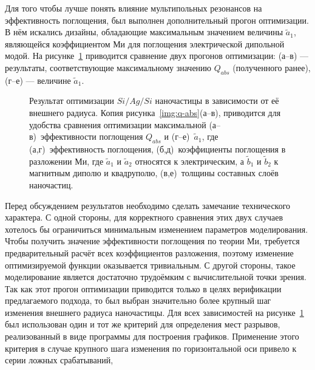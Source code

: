 Для того чтобы лучше понять влияние мультипольных резонансов на
эффективность поглощения, был выполнен дополнительный прогон
оптимизации. В нём искались дизайны, обладающие максимальным значением
величины $\tilde{a}_1$, являющейся коэффициентом Ми для поглощения
электрической дипольной модой. На рисунке~\ref{img:q-abs-a1}
приводится сравнение двух прогонов оптимизации: (а--в) --- результаты,
соответствующие максимальному значению $Q_{abs}$ (полученного ранее),
(г--е) --- величине $\tilde{a}_1$.
\begin{figure}[t]
  \begin{minipage}[ht]{0.495\linewidth}
  \end{minipage}
  \hfill
  \begin{minipage}[ht]{0.495\linewidth}
  \end{minipage}
  \caption{ Результат оптимизации $Si/Ag/Si$ наночастицы в
    зависимости от её внешнего радиуса.  Копия
    рисунка~\ref{img:q-abs}(а--в), приводится для удобства сравнения
    оптимизации максимальной (а--в)~эффективности поглощения $Q_{abs}$
    и (г--е)~$\tilde{a}_1$, где (а,г)~эффективность
    поглощения, (б,д)~коэффициенты поглощения в разложении Ми, где
    $\tilde{a}_1$ и $\tilde{a}_2$ относятся к электрическим, а
    $\tilde{b}_1$ и $\tilde{b}_2$ к магнитным диполю и квадруполю,
    (в,е)~толщины составных слоёв наночастиц.}
  \label{img:q-abs-a1}
\end{figure}
Перед обсуждением результатов необходимо сделать замечание
технического характера.  С одной стороны, для корректного сравнения
этих двух случаев хотелось бы ограничиться минимальным изменением
параметров моделирования.  Чтобы получить значение эффективности поглощения
по теории Ми, требуется предварительный расчёт всех коэффициентов
разложения, поэтому изменение оптимизируемой функции оказывается
тривиальным.  С другой стороны, такое моделирование является
достаточно трудоёмким с вычислительной точки зрения.  Так как этот
прогон оптимизации приводится только в целях верификации предлагаемого
подхода, то был выбран значительно более крупный шаг изменения
внешнего радиуса наночастицы.  Для всех зависимостей на
рисунке~\ref{img:q-abs-a1} был использован один и тот же критерий для
определения мест разрывов, реализованный в виде программы для
построения графиков.  Применение этого критерия в случае крупного шага
изменения по горизонтальной оси привело к серии ложных срабатываний,
